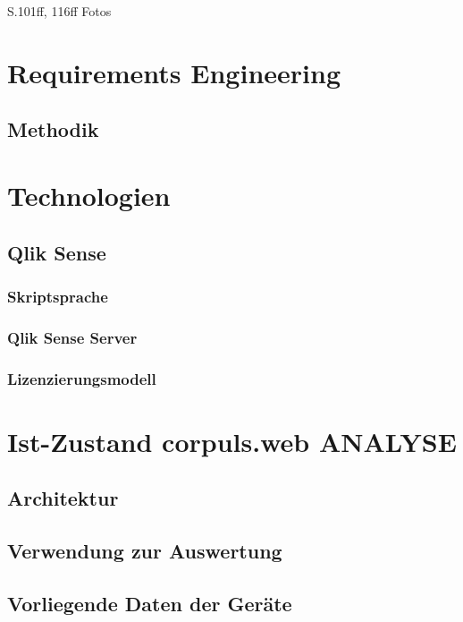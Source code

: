 S.101ff, 116ff Fotos


\section{Requirements Engineering}
\subsection{Methodik}

\section{Technologien}
\subsection{Qlik Sense}
\label{sub:qlik}
\subsubsection{Skriptsprache}
\subsubsection{Qlik Sense Server}
\subsubsection{Lizenzierungsmodell}

\section{Ist-Zustand corpuls.web ANALYSE}
\subsection{Architektur}
\subsection{Verwendung zur Auswertung}
\subsection{Vorliegende Daten der Geräte}


